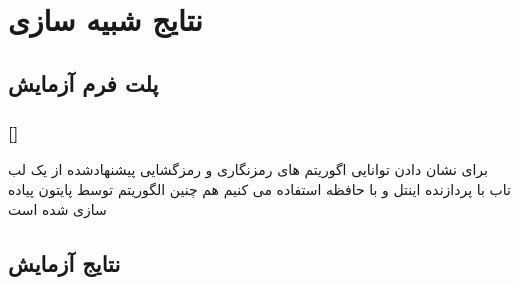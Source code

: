 \documentclass[xcolor=dvipsnames, professionalfonts, 11pt]{beamer}
\newcommand*{\makeframetitle}{\frametitle{\insertsection \hspace{0.1em} {\footnotesize [\insertsubsection]}}}
\begin{document}
\section{نتایج شبیه سازی}
\subsection{پلت فرم آزمایش}
\begin{frame}
    \makeframetitle
    برای نشان دادن توانایی اگوریتم های رمزنگاری و رمزگشایی پیشنهادشده از یک لب تاب با پردازنده اینتل  و با حافظه  استفاده می کنیم هم چنین الگوریتم توسط پایتون پیاده سازی شده است
\end{frame}

\subsection{نتایج آزمایش}
\end{document}
